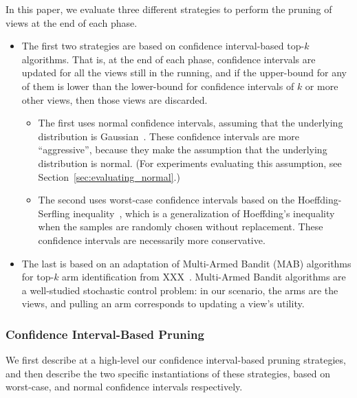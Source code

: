 In this paper, we evaluate three different strategies
to perform the pruning of views at the end of each phase.
\begin{itemize}
\item The first two strategies are based on confidence interval-based top-$k$ algorithms.
That is, at the end of each phase, confidence intervals are updated for all
the views still in the running, and if the upper-bound for any of them
is lower than the lower-bound for confidence intervals of $k$ or more other views,
then those views are discarded.
\begin{itemize}
\item The first uses normal confidence intervals, assuming that 
the underlying distribution is Gaussian~\cite{all-of-statistics}.
These confidence intervals are more ``aggressive'', because they make the assumption
that the underlying distribution is normal.
(For experiments evaluating this assumption, see Section~\ref{sec:evaluating_normal}.)
\item The second uses worst-case confidence intervals based on the
Hoeffding-Serfling inequality~\cite{serfling1974probability}, 
which is a generalization of Hoeffding's inequality~\cite{hoeffding1963probability}
when the samples are randomly chosen without replacement.
These confidence intervals are necessarily more conservative.
\end{itemize}
\item The last is based on an adaptation of Multi-Armed Bandit (MAB) algorithms
for top-$k$ arm identification from XXX~\cite{}. 
Multi-Armed Bandit algorithms are a well-studied stochastic control problem:
in our scenario, the arms are the views, and pulling an arm corresponds
to updating a view's utility.
\end{itemize}


\subsubsection{Confidence Interval-Based Pruning}
We first describe at a high-level our confidence interval-based pruning strategies,
and then describe the two specific instantiations of these strategies,
based on worst-case, and normal confidence intervals respectively.

